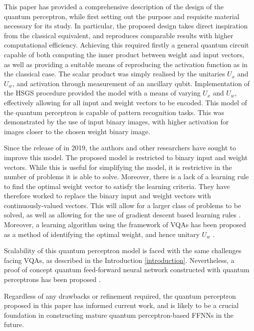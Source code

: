 \documentclass[twocolumn,superscriptaddress]{revtex4-1}
\begin{document}
This paper has provided a comprehensive description of the design of the quantum perceptron, while first setting out the purpose and requisite material necessary for its study. In particular, the proposed design takes direct inspiration from the classical equivalent, and reproduces comparable results with higher computational efficiency. Achieving this required firstly a general quantum circuit capable of both computing the inner product between weight and input vectors, as well as providing a suitable means of reproducing the activation function as in the classical case. The scalar product was simply realised by the unitaries $U_x$ and $U_w$, and activation through measurement of an ancillary qubit. Implementation of the HSGS procedure provided the model with a means of varying $U_x$ and $U_w$, effectively allowing for all input and weight vectors to be encoded. This model of the quantum perceptron is capable of pattern recognition tasks. This was demonstrated by the use of input binary images, with higher activation for images closer to the chosen weight binary image. 

Since the release of \cite{Tacchino_2019} in 2019, the authors and other researchers have sought to improve this model. The proposed model is restricted to binary input and weight vectors. While this is useful for simplifying the model, it is restrictive in the number of problems it is able to solve. Moreover, there is a lack of a learning rule to find the optimal weight vector to satisfy the learning criteria. They have therefore worked to replace the binary input and weight vectors with continuously-valued vectors. This will allow for a larger class of problems to be solved, as well as allowing for the use of gradient descent based learning rules \cite{Mangini_2020, mangini2023variational}. Moreover, a learning algorithm using the framework of VQAs has been proposed as a method of identifying the optimal weight, and hence unitary $U_w$ \cite{Tacchino_2021, mangini2023variational}.

Scalability of this quantum perceptron model is faced with the same challenges facing VQAs, as described in the Introduction \ref{introduction}. Nevertheless, a proof of concept quantum feed-forward neural network constructed with quantum perceptrons has been proposed \cite{Tacchino_2020}.

Regardless of any drawbacks or refinement required, the quantum perceptron proposed in this paper has informed current work, and is likely to be a crucial foundation in constructing mature quantum perceptron-based FFNNs in the future.
\end{document}
